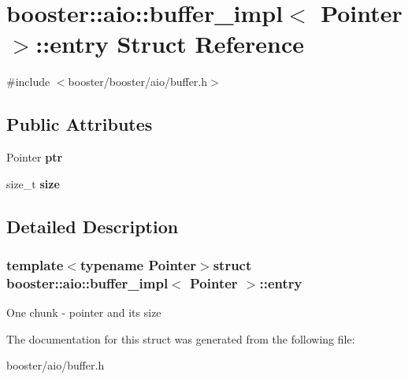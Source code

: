 \section{booster\-:\-:aio\-:\-:buffer\-\_\-impl$<$ Pointer $>$\-:\-:entry Struct Reference}
\label{structbooster_1_1aio_1_1buffer__impl_1_1entry}


{\ttfamily \#include $<$booster/booster/aio/buffer.\-h$>$}

\subsection*{Public Attributes}
\begin{DoxyCompactItemize}
\item 
Pointer {\bfseries ptr}\label{structbooster_1_1aio_1_1buffer__impl_1_1entry_af3b07e6e32ee1a03bd14d5845474b08e}

\item 
size\-\_\-t {\bfseries size}\label{structbooster_1_1aio_1_1buffer__impl_1_1entry_ad9c755195e7ff64956f764defa4206ec}

\end{DoxyCompactItemize}


\subsection{Detailed Description}
\subsubsection*{template$<$typename Pointer$>$struct booster\-::aio\-::buffer\-\_\-impl$<$ Pointer $>$\-::entry}

One chunk -\/ pointer and its size 

The documentation for this struct was generated from the following file\-:\begin{DoxyCompactItemize}
\item 
booster/aio/buffer.\-h\end{DoxyCompactItemize}
